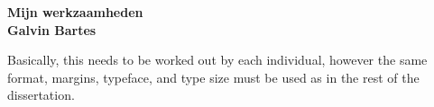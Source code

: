 

\begin{center}
{\LARGE {\bf Mijn werkzaamheden}}\\
\vspace{0.5in}
{\large {\bf Galvin Bartes}}
\end{center}

Basically, this needs to be worked out by each individual, however the same format, margins, typeface, and type size must be used as in the rest of the dissertation. 
